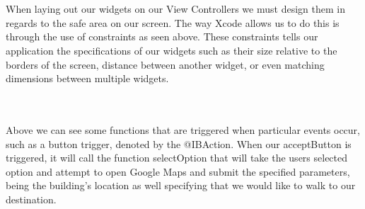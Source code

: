 \documentclass[letterpaper,12pt]{article}
\begin{document}
 \\

 \\

    When laying out our widgets on our View Controllers we must design them in regards to the safe area on our screen. The way Xcode allows us to do this is through the use of constraints as seen above. These constraints tells our application the specifications of our widgets such as their size relative to the borders of the screen, distance between another widget, or even matching dimensions between multiple widgets. 




 \\ \\

    Above we can see some functions that are triggered when particular events occur, such as a button trigger, denoted by the @IBAction. When our acceptButton is triggered, it will call the function selectOption that will take the users selected option and attempt to open Google Maps and submit the specified parameters, being the building's location as well specifying that we would like to walk to our destination. \\ \par
    
 \\
\end{document}
